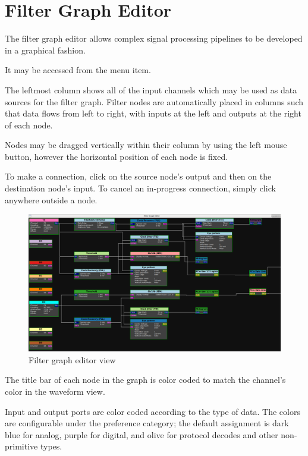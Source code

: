 \chapter{Filter Graph Editor}
\label{grapheditor}

The filter graph editor allows complex signal processing pipelines to be developed in a graphical fashion.

It may be accessed from the  menu item.

The leftmost column shows all of the input channels which may be used as data sources for the filter graph. Filter
nodes are automatically placed in columns such that data flows from left to right, with inputs at the left and outputs
at the right of each node.

Nodes may be dragged vertically within their column by using the left mouse button, however the horizontal position of
each node is fixed.

To make a connection, click on the source node's output and then on the destination node's input. To cancel an
in-progress connection, simply click anywhere outside a node.

\begin{figure}[H]
\centering
\includegraphics[width=17cm]{images/graph-editor.png}
\caption{Filter graph editor view}
\label{graph-editor}
\end{figure}

The title bar of each node in the graph is color coded to match the channel's color in the waveform view.

Input and output ports are color coded according to the type of data. The colors are configurable under the
 preference category; the default assignment is dark blue for analog, purple for
digital, and olive for protocol decodes and other non-primitive types.
